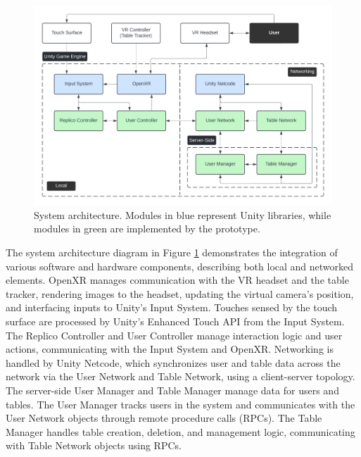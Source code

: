     \begin{figure}[h]
        \centering
        \includegraphics[width=.97\linewidth]{figures/architecture.png}
        \caption{System architecture. Modules in blue represent Unity libraries, while modules in green are implemented by the prototype.}
        \label{fig:architecture}
    \end{figure}

    The system architecture diagram in Figure \ref{fig:architecture} demonstrates the integration of various software and hardware components, describing both local and networked elements. OpenXR manages communication with the VR headset and the table tracker, rendering images to the headset, updating the virtual camera's position, and interfacing inputs to Unity's Input System. Touches sensed by the touch surface are processed by Unity's Enhanced Touch API from the Input System. The Replico Controller and User Controller manage interaction logic and user actions, communicating with the Input System and OpenXR. Networking is handled by Unity Netcode, which synchronizes user and table data across the network via the User Network and Table Network, using a client-server topology. The server-side User Manager and Table Manager manage data for users and tables. The User Manager tracks users in the system and communicates with the User Network objects through remote procedure calls (RPCs). The Table Manager handles table creation, deletion, and management logic, communicating with Table Network objects using RPCs.



